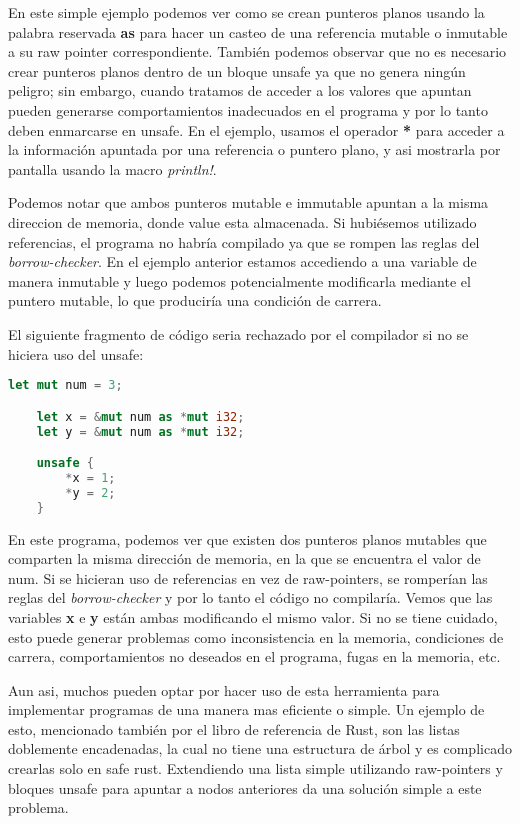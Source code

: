 En este simple ejemplo podemos ver como se crean punteros planos usando la palabra reservada \textbf{as} para hacer un casteo de una referencia mutable o inmutable a su raw pointer correspondiente. También podemos observar que no es necesario crear punteros planos dentro de un bloque unsafe ya que no genera ningún peligro; sin embargo, cuando tratamos de acceder a los valores que apuntan pueden generarse comportamientos inadecuados en el programa y por lo tanto deben enmarcarse en unsafe. En el ejemplo, usamos el operador \textbf{*} para acceder a la información apuntada por una referencia o puntero plano, y asi mostrarla por pantalla usando la macro \textit{println!}.

Podemos notar que ambos punteros mutable e immutable apuntan a la misma direccion de memoria, donde value esta almacenada. Si hubiésemos utilizado referencias, el programa no habría compilado ya que se rompen las reglas del \textit{borrow-checker}. En el ejemplo anterior estamos accediendo a una variable de manera inmutable y luego podemos potencialmente modificarla mediante el puntero mutable, lo que produciría una condición de carrera.

El siguiente fragmento de código seria rechazado por el compilador si no se hiciera uso del unsafe:
\begin{lstlisting}[language=Rust]
    let mut num = 3;

    let x = &mut num as *mut i32;
    let y = &mut num as *mut i32;

    unsafe {
        *x = 1;
        *y = 2;
    }
\end{lstlisting}

En este programa, podemos ver que existen dos punteros planos mutables que comparten la misma dirección de memoria, en la que se encuentra el valor de num. Si se hicieran uso de referencias en vez de raw-pointers, se romperían las reglas del \textit{borrow-checker} y por lo tanto el código no compilaría. Vemos que las variables \textbf{x} e \textbf{y} están ambas modificando el mismo valor. Si no se tiene cuidado, esto puede generar problemas como inconsistencia en la memoria, condiciones de carrera, comportamientos no deseados en el programa, fugas en la memoria, etc.

Aun asi, muchos pueden optar por hacer uso de esta herramienta para implementar programas de una manera mas eficiente o simple. Un ejemplo de esto, mencionado también por el libro de referencia de Rust, son las listas doblemente encadenadas, la cual no tiene una estructura de árbol y es complicado crearlas solo en safe rust. Extendiendo una lista simple utilizando raw-pointers y bloques unsafe para apuntar a nodos anteriores da una solución simple a este problema.

